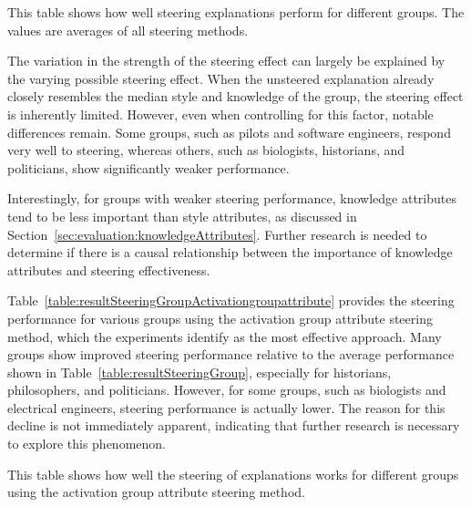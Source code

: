 \begin{table}[ht]
  \caption[]{This table shows how well steering explanations perform for different groups. The values are averages of all steering methods.}%
  \label{table:resultSteeringGroup}
  \centering
  \resultSteeringGroup{}%
\end{table}

The variation in the strength of the steering effect can largely be explained by the varying possible steering effect. When the unsteered explanation already closely resembles the median style and knowledge of the group, the steering effect is inherently limited. However, even when controlling for this factor, notable differences remain. Some groups, such as pilots and software engineers, respond very well to steering, whereas others, such as biologists, historians, and politicians, show significantly weaker performance.

Interestingly, for groups with weaker steering performance, knowledge attributes tend to be less important than style attributes, as discussed in Section~\ref{sec:evaluation:knowledgeAttributes}. Further research is needed to determine if there is a causal relationship between the importance of knowledge attributes and steering effectiveness.

Table~\ref{table:resultSteeringGroupActivationgroupattribute} provides the steering performance for various groups using the activation group attribute steering method, which the experiments identify as the most effective approach. Many groups show improved steering performance relative to the average performance shown in Table~\ref{table:resultSteeringGroup}, especially for historians, philosophers, and politicians. However, for some groups, such as biologists and electrical engineers, steering performance is actually lower. The reason for this decline is not immediately apparent, indicating that further research is necessary to explore this phenomenon.

\begin{table}[ht]
  \caption[]{This table shows how well the steering of explanations works for different groups using the activation group attribute steering method.}%
  \label{table:resultSteeringGroupActivationgroupattribute}
  \centering
  \resultSteeringGroupActivationgroupattribute{}%
\end{table}
